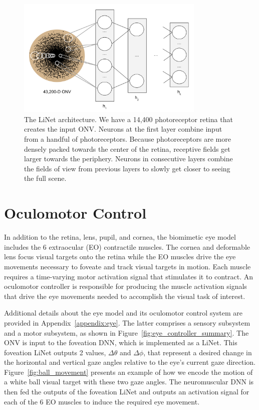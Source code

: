 \documentclass [MS] {UCLAthesis}
\begin{document}
\begin{figure}
    \centering
    \includegraphics[width=0.8\textwidth]{linet_summary2}
    \caption[LiNet architecture]{The LiNet architecture. We have a 14,400 photoreceptor retina that creates the input ONV. Neurons at the first layer combine input from a handful of photoreceptors. Because photoreceptors are more densely packed towards the center of the retina, receptive fields get larger towards the periphery. Neurons in consecutive layers combine the fields of view from previous layers to slowly get closer to seeing the full scene.}
    \label{fig:linet_rgb}
\end{figure}


\section{Oculomotor Control}

In addition to the retina, lens, pupil, and cornea, the biomimetic eye model includes the 6 extraocular (EO) contractile muscles. The cornea and deformable lens focus visual targets onto the retina while the EO muscles drive the eye movements necessary to foveate and track visual targets in motion. Each muscle requires a time-varying motor activation signal that stimulates it to contract. An oculomotor controller is responsible for producing the muscle activation signals that drive the eye movements needed to accomplish the visual task of interest.

Additional details about the eye model and its oculomotor control system are provided in Appendix~\ref{appendix:eye}. The latter comprises a sensory subsystem and a motor subsystem, as shown in Figure~\ref{fig:eye_controller_summary}. The ONV is input to the foveation DNN, which is implemented as a LiNet. This foveation LiNet outputs 2 values, $\Delta\theta$ and $\Delta\phi$, that represent a desired change in the horizontal and vertical gaze angles relative to the eye's current gaze direction. Figure~\ref{fig:ball_movement} presents an example of how we encode the motion of a white ball visual target with these two gaze angles. The neuromuscular DNN is then fed the outputs of the foveation LiNet and outputs an activation signal for each of the 6 EO muscles to induce the required eye movement.
\end{document}
